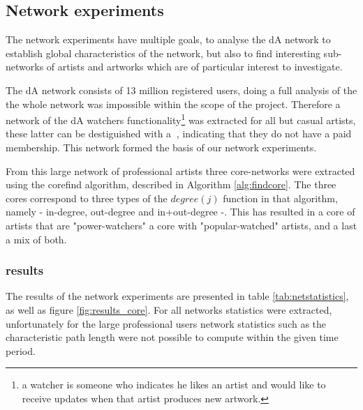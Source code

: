 \subsection{Network experiments}
The network experiments have multiple goals, to analyse the dA network to establish global characteristics of the network, but also to find interesting sub-networks of artists and artworks which are of particular interest to investigate.

The dA network consists of 13 million registered users, doing a full analysis of the the whole network was impossible within the scope of the project. Therefore a network of the dA watchers functionality\footnote{a watcher is someone who indicates he likes an artist and would like to receive updates when that artist produces new artwork.} was extracted for all but casual artists, these latter can be destiguished with a $~$, indicating that they do not have a paid membership. This network formed the basis of our network experiments.

From this large network of professional artists three core-networks were extracted using the corefind algorithm, described in Algorithm \ref{alg:findcore}. The three cores correspond to three types of the $degree(j)$ function in that algorithm, namely - in-degree, out-degree and in+out-degree -. This has resulted in a core of artists that are "power-watchers" a core with "popular-watched" artists, and a last a mix of both.

\subsubsection{results}
The results of the network experiments are presented in table \ref{tab:netstatistics}, as well as figure \ref{fig:results_core}.  For all networks statistics were extracted, unfortunately for the large professional users network statistics such as the characteristic path length were not possible to compute within the given time period.

